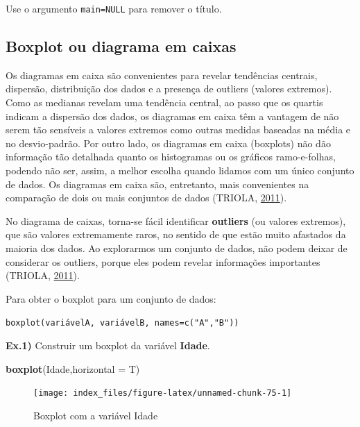 \documentclass[12pt,brazil,oneside]{book}
\newenvironment{Shaded}{\begin{snugshade}}{\end{snugshade}}
\newcommand{\DataTypeTok}[1]{\textcolor[rgb]{0.13,0.29,0.53}{#1}}
\newcommand{\KeywordTok}[1]{\textcolor[rgb]{0.13,0.29,0.53}{\textbf{#1}}}
\newcommand{\NormalTok}[1]{#1}
\begin{document}
Use o argumento \texttt{main=NULL} para remover o título.

\hypertarget{boxplot-ou-diagrama-em-caixas}{%
\subsection{Boxplot ou diagrama em
caixas}\label{boxplot-ou-diagrama-em-caixas}}

Os diagramas em caixa são convenientes para revelar tendências centrais,
dispersão, distribuição dos dados e a presença de outliers (valores
extremos). Como as medianas revelam uma tendência central, ao passo que
os quartis indicam a dispersão dos dados, os diagramas em caixa têm a
vantagem de não serem tão sensíveis a valores extremos como outras
medidas baseadas na média e no desvio-padrão. Por outro lado, os
diagramas em caixa (boxplots) não dão informação tão detalhada quanto os
histogramas ou os gráficos ramo-e-folhas, podendo não ser, assim, a
melhor escolha quando lidamos com um único conjunto de dados. Os
diagramas em caixa são, entretanto, mais convenientes na comparação de
dois ou mais conjuntos de dados (TRIOLA,
\protect\hyperlink{ref-triola1999}{2011}).

No diagrama de caixas, torna-se fácil identificar \textbf{outliers} (ou
valores extremos), que são valores extremamente raros, no sentido de que
estão muito afastados da maioria dos dados. Ao explorarmos um conjunto
de dados, não podem deixar de considerar os outliers, porque eles podem
revelar informações importantes (TRIOLA,
\protect\hyperlink{ref-triola1999}{2011}).

Para obter o boxplot para um conjunto de dados:

\texttt{boxplot(variávelA,\ variávelB,\ names=c("A","B"))}

\textbf{Ex.1)} Construir um boxplot da variável \textbf{Idade}.

\begin{Shaded}
\begin{Highlighting}[]
\KeywordTok{boxplot}\NormalTok{(Idade,}\DataTypeTok{horizontal =}\NormalTok{ T)}
\end{Highlighting}
\end{Shaded}

\begin{figure}[H]

{\centering \texttt{[image: index\_files/figure-latex/unnamed-chunk-75-1]} 

}

\caption{Boxplot com a variável Idade}\label{fig:unnamed-chunk-75}
\end{figure}
\end{document}
